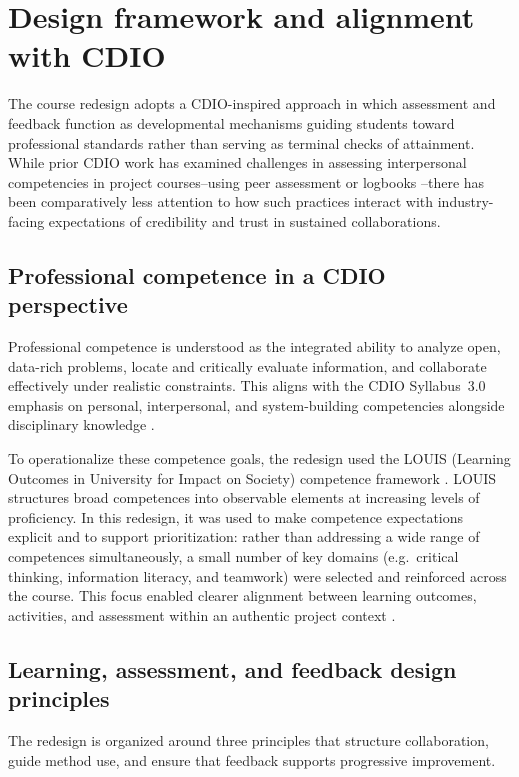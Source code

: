 \section{Design framework and alignment with CDIO}
The course redesign adopts a CDIO-inspired approach in which assessment and feedback function as developmental mechanisms guiding students toward professional standards rather than serving as terminal checks of attainment. While prior CDIO work has examined challenges in assessing interpersonal competencies in project courses--using peer assessment or logbooks \parencite{hansen2023assessment, spooner2008teamwork, junaid2018logbook}--there has been comparatively less attention to how such practices interact with industry-facing expectations of credibility and trust in sustained collaborations. 

\subsection{Professional competence in a CDIO perspective}

Professional competence is understood as the integrated ability to analyze open, data-rich problems, locate and critically evaluate information, and collaborate effectively under realistic constraints. This aligns with the CDIO Syllabus~3.0 emphasis on personal, interpersonal, and system-building competencies alongside disciplinary knowledge \parencite{CDIOSyllabus3}.

To operationalize these competence goals, the redesign used the LOUIS (Learning Outcomes in University for Impact on Society) competence framework \parencite{auroraLOUIS}. LOUIS structures broad competences into observable elements at increasing levels of proficiency. In this redesign, it was used to make competence expectations explicit and to support prioritization: rather than addressing a wide range of competences simultaneously, a small number of key domains (e.g.\ critical thinking, information literacy, and teamwork) were selected and reinforced across the course. This focus enabled clearer alignment between learning outcomes, activities, and assessment within an authentic project context \parencite{biggs_constructive}.

\subsection{Learning, assessment, and feedback design principles}
The redesign is organized around three principles that structure collaboration, guide method use, and ensure that feedback supports progressive improvement.

